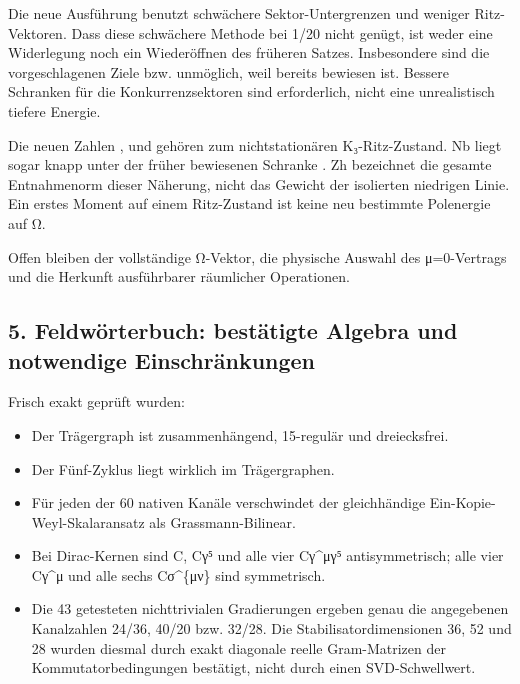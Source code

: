 Die neue Ausführung benutzt schwächere Sektor-Untergrenzen und weniger
Ritz-Vektoren. Dass diese schwächere Methode bei 1/20 nicht genügt, ist
weder eine Widerlegung noch ein Wiederöffnen des früheren Satzes.
Insbesondere sind die vorgeschlagenen Ziele  bzw.
 unmöglich, weil bereits 
bewiesen ist. Bessere Schranken für die Konkurrenzsektoren sind
erforderlich, nicht eine unrealistisch tiefere Energie.

Die neuen Zahlen ,  und
 gehören zum nichtstationären K₃-Ritz-Zustand.
Nb liegt sogar knapp unter der früher bewiesenen Schranke
. Zh bezeichnet die gesamte Entnahmenorm dieser
Näherung, nicht das Gewicht der isolierten niedrigen Linie. Ein erstes
Moment auf einem Ritz-Zustand ist keine neu bestimmte Polenergie auf Ω.

Offen bleiben der vollständige Ω-Vektor, die physische Auswahl des
μ=0-Vertrags und die Herkunft ausführbarer räumlicher Operationen.

\subsection{5. Feldwörterbuch: bestätigte Algebra und notwendige
Einschränkungen}\label{feldwuxf6rterbuch-bestuxe4tigte-algebra-und-notwendige-einschruxe4nkungen}

Frisch exakt geprüft wurden:

\begin{itemize}
\tightlist
\item
  Der Trägergraph ist zusammenhängend, 15-regulär und dreiecksfrei.
\item
  Der Fünf-Zyklus  liegt wirklich im
  Trägergraphen.
\item
  Für jeden der 60 nativen Kanäle verschwindet der gleichhändige
  Ein-Kopie-Weyl-Skalaransatz  als Grassmann-Bilinear.
\item
  Bei Dirac-Kernen sind C, Cγ⁵ und alle vier Cγ\^{}μγ⁵ antisymmetrisch;
  alle vier Cγ\^{}μ und alle sechs Cσ\^{}\{μν\} sind symmetrisch.
\item
  Die 43 getesteten nichttrivialen Gradierungen ergeben genau die
  angegebenen Kanalzahlen 24/36, 40/20 bzw. 32/28. Die
  Stabilisatordimensionen 36, 52 und 28 wurden diesmal durch exakt
  diagonale reelle Gram-Matrizen der Kommutatorbedingungen bestätigt,
  nicht durch einen SVD-Schwellwert.
\end{itemize}


